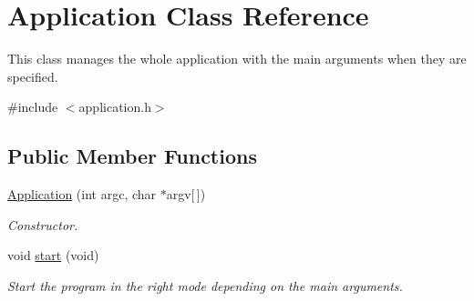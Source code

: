 \hypertarget{class_application}{}\section{Application Class Reference}
\label{class_application}


This class manages the whole application with the main arguments when they are specified.  




{\ttfamily \#include $<$application.\+h$>$}

\subsection*{Public Member Functions}
\begin{DoxyCompactItemize}
\item 
\hyperlink{class_application_a4f945a7f8d003a3b8f716f7128206329}{Application} (int argc, char $\ast$argv\mbox{[}$\,$\mbox{]})
\begin{DoxyCompactList}\small\item\em Constructor. \end{DoxyCompactList}\item 
\hypertarget{class_application_aca490f681d4c3c86187b64426217bbfd}{}void \hyperlink{class_application_aca490f681d4c3c86187b64426217bbfd}{start} (void)\label{class_application_aca490f681d4c3c86187b64426217bbfd}

\begin{DoxyCompactList}\small\item\em Start the program in the right mode depending on the main arguments. \end{DoxyCompactList}\end{DoxyCompactItemize}
